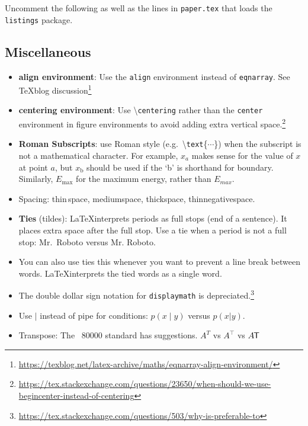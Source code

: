Uncomment the following as well as the lines in \texttt{paper.tex} that loads the \texttt{listings} package.
% 



\subsection{Miscellaneous}

\begin{itemize}
	\item \textbf{align environment}: Use the \texttt{align} environment instead of \texttt{eqnarray}. See TeXblog discussion\footnote{\url{https://texblog.net/latex-archive/maths/eqnarray-align-environment/}}
	\item \textbf{centering environment}: Use \textbackslash\texttt{centering} rather than the \texttt{center} environment in figure environments to avoid adding extra vertical space.\footnote{\url{https://tex.stackexchange.com/questions/23650/when-should-we-use-begincenter-instead-of-centering}}
	\item \textbf{Roman Subscripts}: use Roman style (e.g.~\textbackslash \texttt{text}\{$\cdots$\}) when the subscript is not a mathematical character. For example, $x_a$ makes sense for the value of $x$ at point $a$, but $x_\text{b}$ should be used if the `b' is shorthand for boundary. Similarly, $E_\text{max}$ for the maximum energy, rather than $E_{max}$.
	\item Spacing: thin\,space, medium\:space, thick\;space, thin\!negative\!space.
	\item \textbf{Ties} (tildes): \LaTeX interprets periods as full stops (end of a sentence). It places extra space after the full stop. Use a tie when a period is not a full stop: Mr.~Roboto versus Mr. Roboto. 
	\item You can also use ties this whenever you want to prevent a line break between words. \LaTeX interprets the tied words as a single word.
	\item The double dollar sign notation for \texttt{displaymath} is depreciated.\footnote{\url{https://tex.stackexchange.com/questions/503/why-is-preferable-to}}
	\item Use $\mid$ instead of pipe for conditions: $p(x\mid y)$ versus $p(x|y)$.
	\item Transpose: The ~80000 standard has suggestions. $A^T$ vs $A^\top$ vs $A\mkern-1.5mu\mathsf{T}$
\end{itemize}


